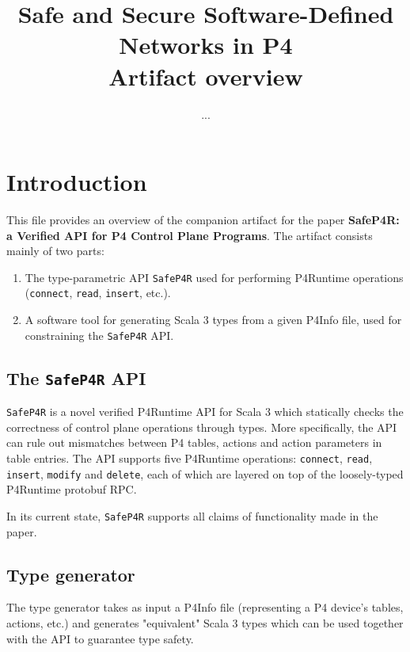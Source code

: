 \documentclass{article}
\title{Safe and Secure Software-Defined Networks in P4\\
    Artifact overview}
\author{...}
\begin{document}
\maketitle

\section{Introduction}
This file provides an overview of the companion artifact for the paper
\textbf{SafeP4R: a Verified API for P4 Control Plane Programs}.
The artifact consists mainly of two parts:

\begin{enumerate}
    \item The type-parametric API \texttt{SafeP4R} used for performing
        P4Runtime operations (\texttt{connect}, \texttt{read}, \texttt{insert},
        etc.).
    \item A software tool for generating Scala 3 types from a given P4Info
        file, used for constraining the \texttt{SafeP4R} API.
\end{enumerate}

\subsection{The \texttt{SafeP4R} API}
\texttt{SafeP4R} is a novel verified P4Runtime API for Scala 3 which statically
checks the correctness of control plane operations through types. More
specifically, the API can rule out mismatches between P4 tables, actions and
action parameters in table entries. The API supports five P4Runtime operations:
\texttt{connect}, \texttt{read}, \texttt{insert}, \texttt{modify} and
\texttt{delete}, each of which are layered on top of the loosely-typed P4Runtime
protobuf RPC.

In its current state, \texttt{SafeP4R} supports all claims of functionality
made in the paper.

\subsection{Type generator}
The type generator takes as input a P4Info file (representing a P4 device's
tables, actions, etc.) and generates "equivalent" Scala 3 types which can be
used together with the API to guarantee type safety.
\end{document}
